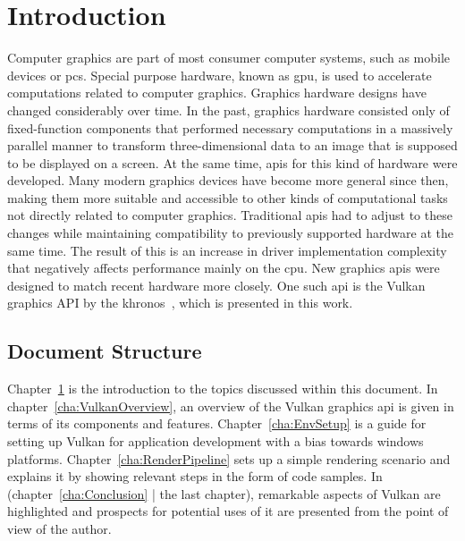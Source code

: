 
\chapter{Introduction}
\label{cha:Introduction}
  Computer graphics are part of most consumer computer systems, such as mobile devices or \glspl{pc}.
  Special purpose hardware, known as \gls{gpu}, is used to accelerate computations related to computer graphics.
  Graphics hardware designs have changed considerably over time.
  In the past, graphics hardware consisted only of fixed-function components that performed necessary computations in a massively parallel manner to transform three-dimensional data to an image that is supposed to be displayed on a screen.
  At the same time, \glspl{api} for this kind of hardware were developed.
  Many modern graphics devices have become more general since then, making them more suitable and accessible to other kinds of computational tasks not directly related to computer graphics.
  Traditional \glspl{api} had to adjust to these changes while maintaining compatibility to previously supported hardware at the same time.
  The result of this is an increase in driver implementation complexity that negatively affects performance mainly on the \gls{cpu}.
  New graphics \glspl{api} were designed to match recent hardware more closely.
  One such \gls{api} is the Vulkan graphics API by the \gls{khronos}~\cite{vkspec}, which is presented in this work.


  \section{Document Structure}
    Chapter~\ref{cha:Introduction} is the introduction to the topics discussed within this document.
    In chapter~\ref{cha:VulkanOverview}, an overview of the Vulkan graphics \gls{api} is given in terms of its components and features.
    Chapter~\ref{cha:EnvSetup} is a guide for setting up Vulkan for application development with a bias towards \gls{windows} platforms.
    Chapter~\ref{cha:RenderPipeline} sets up a simple rendering scenario and explains it by showing relevant steps in the form of code samples.
    In (chapter~\ref{cha:Conclusion} | the last chapter), remarkable aspects of Vulkan are highlighted and prospects for potential uses of it are presented from the point of view of the author.

